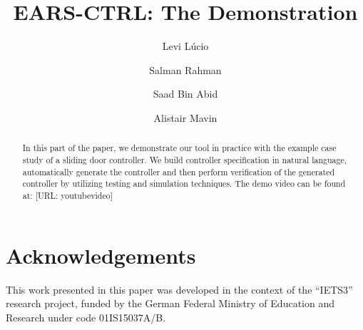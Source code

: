 \documentclass{llncs}
\begin{document}
%
\frontmatter          %

\mainmatter              %
%
\title{EARS-CTRL: The Demonstration}
%
\titlerunning{}  %
%
\author{Levi L\'ucio \and Salman Rahman
 \and Saad Bin Abid \and Alistair Mavin}
%
\authorrunning{} %
%
\tocauthor{}
%

\maketitle              %

\begin{abstract}
In this part of the paper, we demonstrate our tool in practice with the example
case study of a sliding door controller. We build controller specification in
natural language, automatically generate the controller and then perform
verification of the generated controller by utilizing testing and simulation
techniques. The demo video can be found at:
[URL: youtubevideo]
\end{abstract}







\section*{Acknowledgements}
This work presented in this paper was developed in the context of the
``IETS3'' research project, funded by the German Federal Ministry of Education
and Research under code 01IS15037A/B.



\end{document}
